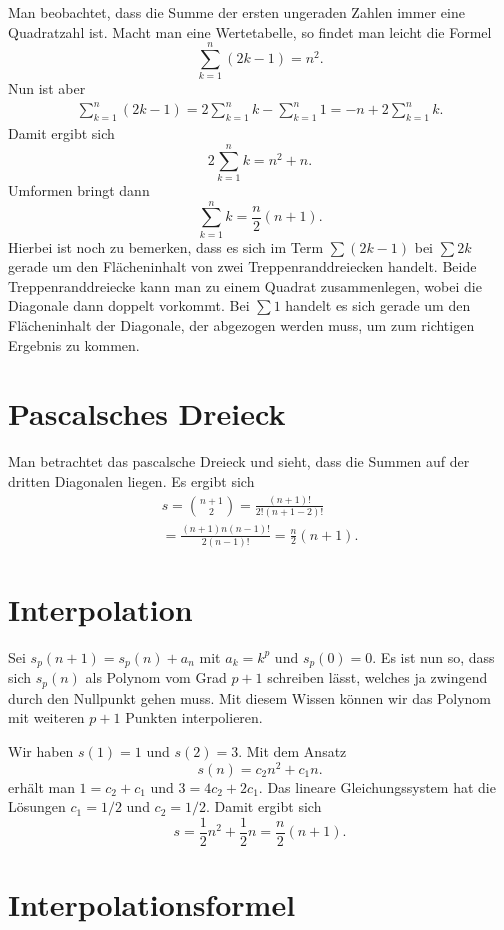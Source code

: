 \documentclass[a4paper,11pt,fleqn,twocolumn,twoside]{scrartcl}
\begin{document}
Man beobachtet, dass die Summe der ersten ungeraden Zahlen immer
eine Quadratzahl ist. Macht man eine Wertetabelle, so findet man leicht
die Formel%
\[\sum_{k=1}^n (2k-1) = n^2.\]
Nun ist aber
\begin{gather*}
\sum_{k=1}^n (2k-1) = 2\sum_{k=1}^n k - \sum_{k=1}^n 1
= -n+2\sum_{k=1}^n k.
\end{gather*}
Damit ergibt sich
\[2\sum_{k=1}^n k = n^2+n.\]
Umformen bringt dann
\[\sum_{k=1}^n k = \frac{n}{2}(n+1).\]
Hierbei ist noch zu bemerken, dass es sich im Term $\sum(2k-1)$ bei
$\sum 2k$ gerade um den Flächeninhalt von zwei Treppenranddreiecken
handelt. Beide Treppenranddreiecke kann man zu einem Quadrat
zusammenlegen, wobei die Diagonale dann doppelt vorkommt. Bei $\sum 1$
handelt es sich gerade um den Flächeninhalt der Diagonale,
der abgezogen werden muss, um zum richtigen Ergebnis zu kommen.


\section{Pascalsches Dreieck}

Man betrachtet das pascalsche Dreieck und sieht, dass
die Summen auf der dritten Diagonalen liegen. Es ergibt sich%
\begin{gather*}
s = \binom{n+1}{2} = \frac{(n+1)!}{2!(n+1-2)!}\\
= \frac{(n+1)n(n-1)!}{2(n-1)!} = \frac{n}{2}(n+1).
\end{gather*}


\section{Interpolation}

Sei $s_p(n+1)=s_p(n)+a_n$ mit $a_k=k^p$ und $s_p(0)=0$. Es ist nun so,
dass sich $s_p(n)$ als Polynom vom Grad $p+1$ schreiben lässt, welches
ja zwingend durch den Nullpunkt gehen muss. Mit diesem Wissen können
wir das Polynom mit weiteren $p+1$ Punkten interpolieren.

Wir haben $s(1)=1$ und $s(2)=3$. Mit dem Ansatz%
\[s(n)=c_2n^2+c_1n.\]
erhält man $1=c_2+c_1$ und $3=4c_2+2c_1$. Das lineare
Gleichungssystem hat die Lösungen $c_1=1/2$ und $c_2=1/2$.
Damit ergibt sich%
\[s=\frac{1}{2}n^2+\frac{1}{2}n = \frac{n}{2}(n+1).\]


\section{Interpolationsformel}
\end{document}
